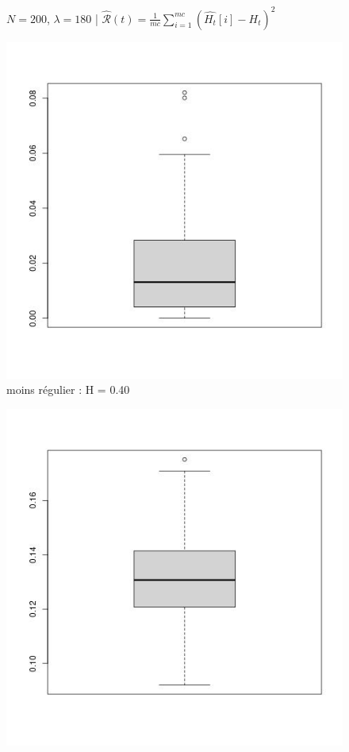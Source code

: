 \begin{figure}[H]
	\centering
	$N = 200$, $\lambda = 180$ | $\widehat{\mathcal R}(t) = \frac 1 {mc} \sum\limits_{i=1}^{mc} (\widehat{H_t}[i] - H_t)^2$

	\centering
	\begin{minipage}{0.3\linewidth}
		\centering
		\includegraphics[width=\textwidth]{Images/N200_lbd180_box3_2.jpg}
		moins régulier : H = 0.40
	\end{minipage}
	\begin{minipage}{0.3\linewidth}
		\centering
		\includegraphics[width=\textwidth]{Images/N200_lbd180_box6_2.jpg}

\end{minipage}
\end{figure}

